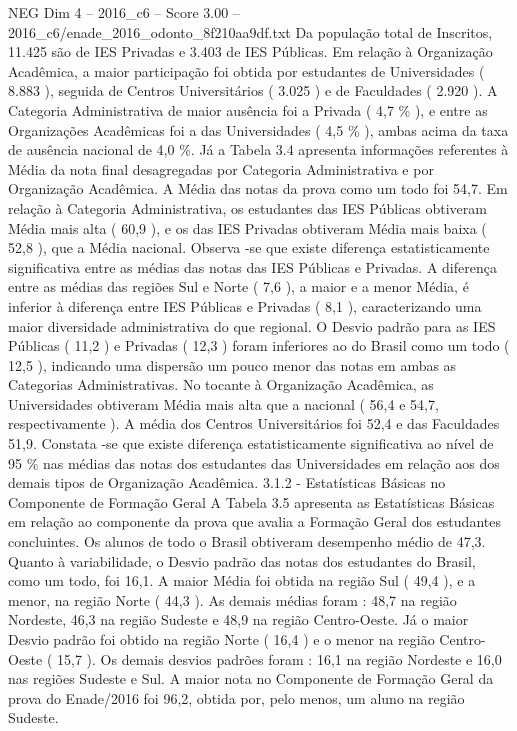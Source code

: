 \begin{textsample}{NEG Dim 4 – 2016\_c6 – Score 3.00 – 2016\_c6/enade\_2016\_odonto\_8f210aa9df.txt}
Da população total de Inscritos, 11.425 são de IES Privadas e 3.403 de IES Públicas.
Em relação à Organização Acadêmica, a maior participação foi obtida por estudantes de Universidades ( 8.883 ), seguida de Centros Universitários ( 3.025 ) e de Faculdades ( 2.920 ).
A Categoria Administrativa de maior ausência foi a Privada ( 4,7 \% ), e entre as Organizações Acadêmicas foi a das Universidades ( 4,5 \% ), ambas acima da taxa de ausência nacional de 4,0 \%.
Já a Tabela 3.4 apresenta informações referentes à Média da nota final desagregadas por Categoria Administrativa e por Organização Acadêmica.
A Média das notas da prova como um todo foi 54,7.
Em relação à Categoria Administrativa, os estudantes das IES Públicas obtiveram Média mais alta ( 60,9 ), e os das IES Privadas obtiveram Média mais baixa ( 52,8 ), que a Média nacional.
Observa -se que existe diferença estatisticamente significativa entre as médias das notas das IES Públicas e Privadas.
A diferença entre as médias das regiões Sul e Norte ( 7,6 ), a maior e a menor Média, é inferior à diferença entre IES Públicas e Privadas ( 8,1 ), caracterizando uma maior diversidade administrativa do que regional.
O Desvio padrão para as IES Públicas ( 11,2 ) e Privadas ( 12,3 ) foram inferiores ao do Brasil como um todo ( 12,5 ), indicando uma dispersão um pouco menor das notas em ambas as Categorias Administrativas.
No tocante à Organização Acadêmica, as Universidades obtiveram Média mais alta que a nacional ( 56,4 e 54,7, respectivamente ).
A média dos Centros Universitários foi 52,4 e das Faculdades 51,9.
Constata -se que existe diferença estatisticamente significativa ao nível de 95 \% nas médias das notas dos estudantes das Universidades em relação aos dos demais tipos de Organização Acadêmica. 3.1.2 - Estatísticas Básicas no Componente de Formação Geral A Tabela 3.5 apresenta as Estatísticas Básicas em relação ao componente da prova que avalia a Formação Geral dos estudantes concluintes.
Os alunos de todo o Brasil obtiveram desempenho médio de 47,3.
Quanto à variabilidade, o Desvio padrão das notas dos estudantes do Brasil, como um todo, foi 16,1.
A maior Média foi obtida na região Sul ( 49,4 ), e a menor, na região Norte ( 44,3 ).
As demais médias foram : 48,7 na região Nordeste, 46,3 na região Sudeste e 48,9 na região Centro-Oeste.
Já o maior Desvio padrão foi obtido na região Norte ( 16,4 ) e o menor na região Centro-Oeste ( 15,7 ).
Os demais desvios padrões foram : 16,1 na região Nordeste e 16,0 nas regiões Sudeste e Sul.
A maior nota no Componente de Formação Geral da prova do Enade/2016 foi 96,2, obtida por, pelo menos, um aluno na região Sudeste.

\end{textsample}
